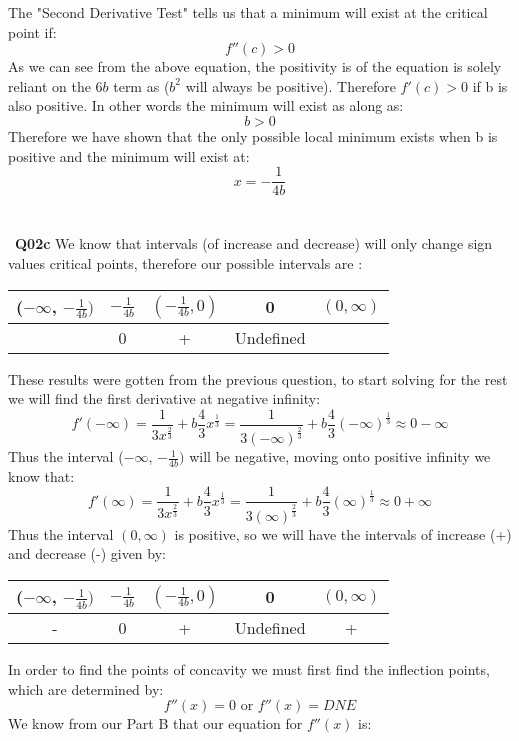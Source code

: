 \documentclass[11pt]{article}
\begin{document}
The "Second Derivative Test" tells us that a minimum will exist at the critical point if:
\[ f''(c) > 0 \]
As we can see from the above equation, the positivity is of the equation is solely reliant on the $6b$ term as ($b^2$ will always be positive). Therefore $f'(c) > 0$ if b is also positive. In other words the minimum will exist as along as:
\[ b > 0 \]
Therefore we have shown that the only possible local minimum exists when b is positive and the minimum will exist at:
\[ x= -\frac{1}{4b} \]
\\\\\
\textbf{Q02c} We know that intervals (of increase and decrease) will only change sign values critical points, therefore our possible intervals are :
\begin{center}
 \begin{tabular}{||c c c c c||} 
 \hline
 ($-\infty$, $-\frac{1}{4b})$ & $-\frac{1}{4b}$ & $(-\frac{1}{4b}, 0)$ & 0 & $(0,\infty)$  \\ [0.5ex] 
 \hline\hline
& 0 & + & Undefined &\\ 
 \hline
\end{tabular}
\end{center}
These results were gotten from the previous question, to start solving for the rest we will find the first derivative at negative infinity:
\[ f'(-\infty) =  \frac{1}{3x^{\frac{2}{3}}} + b\frac{4}{3}x^{\frac{1}{3}} = \frac{1}{3(-\infty)^{\frac{2}{3}}} + b\frac{4}{3}(-\infty)^{\frac{1}{3}} \approx 0 -\infty  \]
Thus the interval ($-\infty$, $-\frac{1}{4b})$ will be negative, moving onto positive infinity we know that:
\[ f'(\infty) =  \frac{1}{3x^{\frac{2}{3}}} + b\frac{4}{3}x^{\frac{1}{3}} = \frac{1}{3(\infty)^{\frac{2}{3}}} + b\frac{4}{3}(\infty)^{\frac{1}{3}} \approx 0 + \infty  \]
Thus the interval $(0,\infty)$ is positive, so we will have the intervals of increase (+) and decrease (-) given by:
\begin{center}
 \begin{tabular}{||c c c c c||} 
 \hline
 ($-\infty$, $-\frac{1}{4b})$ & $-\frac{1}{4b}$ & $(-\frac{1}{4b}, 0)$ & 0 & $(0,\infty)$  \\ [0.5ex] 
 \hline\hline
- & 0 & + & Undefined & +\\ 
 \hline
\end{tabular}
\end{center}
In order to find the points of concavity we must first find the inflection points, which are determined by:
\[ f''(x) = 0 \text{ or } f''(x) = DNE \]
We know from our Part B that our equation for $f''(x)$ is:
\end{document}
